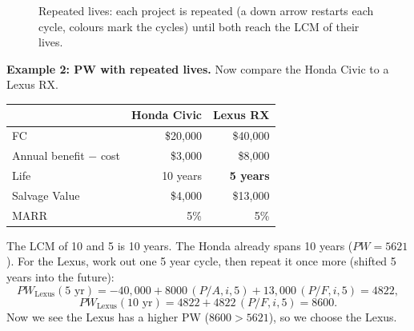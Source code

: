 \documentclass[11pt]{article}
\begin{document}
\begin{figure}[h]
\centering
{}
\caption*{Repeated lives: each project is repeated (a down arrow restarts each cycle, colours mark the cycles) until both reach the LCM of their lives.}
\end{figure}

\textbf{Example 2: PW with repeated lives.} Now compare the Honda Civic to a
Lexus RX.

\begin{center}
\small
\begin{tabular}{lrr}
\toprule
 & \textcolor{cHonda}{\textbf{Honda Civic}} & \textcolor{cLexus}{\textbf{Lexus RX}}\\
\midrule
FC & \textcolor{cHonda}{\$20{,}000} & \textcolor{cLexus}{\$40{,}000}\\
Annual benefit $-$ cost & \textcolor{cHonda}{\$3{,}000} & \textcolor{cLexus}{\$8{,}000}\\
Life & \textcolor{cHonda}{10 years} & \textcolor{cLexus}{\textbf{5 years}}\\
Salvage Value & \textcolor{cHonda}{\$4{,}000} & \textcolor{cLexus}{\$13{,}000}\\
MARR & \textcolor{cHonda}{5\%} & \textcolor{cLexus}{5\%}\\
\bottomrule
\end{tabular}
\end{center}

The LCM of 10 and 5 is 10 years. The Honda already spans 10 years ($PW = 5621$).
For the Lexus, work out one 5 year cycle, then repeat it once more (shifted 5
years into the future):
\[
PW_{\text{Lexus}}(5\text{ yr}) = -40{,}000 + 8000\,(P/A, i, 5) + 13{,}000\,(P/F, i, 5) = 4822,
\]
\[
PW_{\text{Lexus}}(10\text{ yr}) = 4822 + 4822\,(P/F, i, 5) = 8600.
\]
Now we see the Lexus has a higher PW ($8600 > 5621$), so we choose the Lexus.
\end{document}
